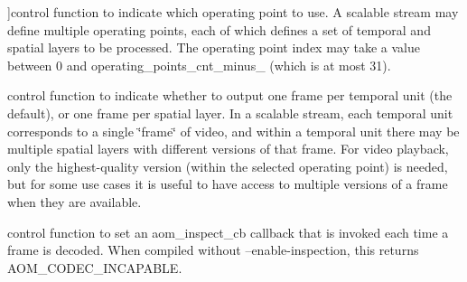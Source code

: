 \begin{Desc}
\begin{description}
{}]control function to indicate which operating point to use. A scalable stream may define multiple operating points, each of which defines a set of temporal and spatial layers to be processed. The operating point index may take a value between 0 and operating\+\_\+points\+\_\+cnt\+\_\+minus\+\_ (which is at most 31). \item[{\em 
A\+V1\+D\+\_\+\+S\+E\+T\+\_\+\+O\+U\+T\+P\+U\+T\+\_\+\+A\+L\+L\+\_\+\+L\+A\+Y\+E\+RS\hypertarget{group__aom__decoder_gga3865fd4b3192489baa9a5c3632ebe97ba8d51f96b8877b665225f5cfaa73ded8e}{}\label{group__aom__decoder_gga3865fd4b3192489baa9a5c3632ebe97ba8d51f96b8877b665225f5cfaa73ded8e}
}]control function to indicate whether to output one frame per temporal unit (the default), or one frame per spatial layer. In a scalable stream, each temporal unit corresponds to a single \char`\"{}frame\char`\"{} of video, and within a temporal unit there may be multiple spatial layers with different versions of that frame. For video playback, only the highest-\/quality version (within the selected operating point) is needed, but for some use cases it is useful to have access to multiple versions of a frame when they are available. \item[{\em 
A\+V1\+\_\+\+S\+E\+T\+\_\+\+I\+N\+S\+P\+E\+C\+T\+I\+O\+N\+\_\+\+C\+A\+L\+L\+B\+A\+CK\hypertarget{group__aom__decoder_gga3865fd4b3192489baa9a5c3632ebe97bae02fd57774db8c30e49b083fa51b6236}{}\label{group__aom__decoder_gga3865fd4b3192489baa9a5c3632ebe97bae02fd57774db8c30e49b083fa51b6236}
}]control function to set an aom\+\_\+inspect\+\_\+cb callback that is invoked each time a frame is decoded. When compiled without --enable-\/inspection, this returns A\+O\+M\+\_\+\+C\+O\+D\+E\+C\+\_\+\+I\+N\+C\+A\+P\+A\+B\+LE. \end{description}
\end{Desc}
